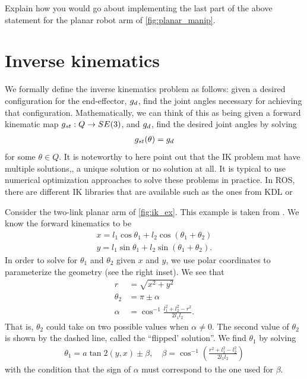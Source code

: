 \begin{homework}
	Explain how you would go about implementing the last part of the above statement for the planar robot arm of \autoref{fig:planar_manip}.
\end{homework}

\section{Inverse kinematics}
%
We formally define the inverse kinematics problem as follows: given a desired configuration for the end-effector, $g_d$, find the joint angles necessary for achieving that configuration. Mathematically, we can think of this as being given a forward kinematic map $g_{st}: Q \rightarrow SE(3)$, and $g_d$, find the desired joint angles by solving 
%
\begin{align}
	g_{st}(\theta) = g_d
	\label{eq:inv_kine_prob}
\end{align}
%
for some $\theta \in Q$. It is noteworthy to here point out that the IK problem mat have multiple solutions,, a unique solution or no solution at all. It is typical to use numerical optimization approaches to solve these problems in practice. In ROS, there are different IK libraries that are available such as the ones from \textsc{KDL} or 

\begin{example}
	Consider the two-link planar arm of \autoref{fig:ik_ex}. This example is taken from \cite{MurrayBook}. We know the forward kinematics to be 
	\begin{align}
		x = l_1 \cos \theta_1 + l_2 \cos(\theta_1 + \theta_2) \nonumber \\
		y = l_1 \sin \theta_1 + l_2 \sin(\theta_1 + \theta_2).
	\end{align}
	In order to solve for $\theta_1$ and $\theta_2$ given $x$ and $y$, we use polar coordinates to parameterize the geometry (see the right inset). We see that 
	\begin{subequations}
		\begin{align}
			r &= \sqrt{x^2 + y^2} \\
			\theta_2 &= \pi \pm \alpha \\
			\alpha &= \cos^{-1} \frac{l_1^2 + l_2^2- r^2}{2 l_1 l_2}.
		\end{align}
	\end{subequations}
	That is, $\theta_2$ could take on two possible values when $\alpha \neq 0$. The second value of $\theta_2$ is shown by the dashed line, called the ``flipped' solution''. We find $\theta_1$ by solving
	\begin{align}
	\theta_1 = a\tan2(y,x) \pm \beta, \quad \beta = \cos^{-1}\left(\frac{r^2 + l_1^2 - l_2^2}{2 l_1l_2}\right)
	\end{align}
	with the condition that the sign of $\alpha$ must correspond to the one used for $\beta$.
\end{example}


